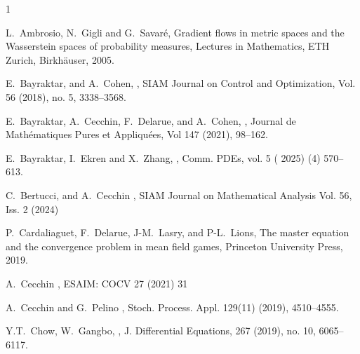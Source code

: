 \documentclass[10pt]{article}
\numberwithin{equation}{section}
\begin{document}
%
%
%

\providecommand{\bysame}{\leavevmode\hbox to3em{\hrulefill}\thinspace}
\providecommand{\MR}{\relax\ifhmode\unskip\space\fi MR }
\providecommand{\MRhref}[2]{%
  \href{http://www.ams.org/mathscinet-getitem?mr=#1}{#2}
}
\providecommand{\href}[2]{#2}
\begin{thebibliography}{1} 

{\normalsize
{} L.~Ambrosio, N.~Gigli and G.~Savar\'e, 
\newblock Gradient flows in metric spaces and the Wasserstein spaces of probability measures, 
\newblock Lectures in Mathematics, ETH Zurich, Birkh\"auser, 2005.  


 E.~Bayraktar, and A.~Cohen, 
, 
\newblock  SIAM Journal on Control and Optimization, Vol. 56 (2018), no. 5, 3338--3568.

 E.~Bayraktar, A.~Cecchin, F.~Delarue, and A.~Cohen, 
, 
\newblock Journal de Math\'ematiques Pures et Appliqu\'ees, Vol 147 (2021), 98--162.

 E.~Bayraktar, I.~Ekren and X.~Zhang, 
, 
\newblock Comm. PDEs, vol. 5 ( 2025) (4) 570--613.

 C.~Bertucci, and A.~Cecchin
, 
\newblock SIAM Journal on Mathematical Analysis Vol. 56, Iss. 2 (2024) 

 P.~Cardaliaguet, F.~Delarue, J-M.~Lasry, and P-L.~Lions,  
\newblock The master equation and the convergence problem in mean field games, 
\newblock  Princeton University Press, 2019.

 A.~Cecchin
, 
\newblock ESAIM: COCV 27 (2021) 31


 A.~Cecchin and G.~Pelino 
, 
\newblock Stoch. Process. Appl. 129(11) (2019), 4510--4555.


 Y.T.~Chow, W.~Gangbo,
,
\newblock J. Differential Equations, 267 (2019), no. 10, 6065--6117.

}
\end{thebibliography}
\end{document}
